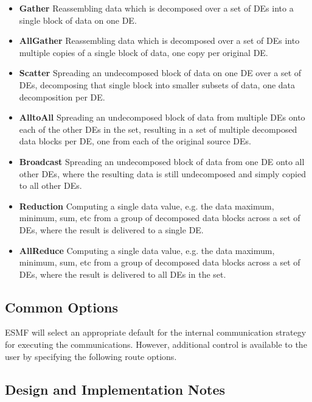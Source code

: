 \begin{itemize}

\item {\bf Gather}
Reassembling data which is decomposed over a set of DEs into a single
block of data on one DE.
\item {\bf AllGather}
Reassembling data which is decomposed over a set of DEs into multiple
copies of a single block of data, one copy per original DE.
\item {\bf Scatter}
Spreading an undecomposed block of data on one DE over a set of DEs,
decomposing that single block into smaller subsets of data, one
data decomposition per DE.
\item {\bf AlltoAll}
Spreading an undecomposed block of data from multiple DEs onto
each of the other DEs in the set, resulting in a set of multiple decomposed 
data blocks per DE, one from each of the original source DEs.
\item {\bf Broadcast}
Spreading an undecomposed block of data from one DE onto all other
DEs, where the resulting data is still undecomposed and simply
copied to all other DEs.
\item {\bf Reduction}
Computing a single data value, e.g. the data maximum, minimum, sum, etc
from a group of decomposed data blocks across a set of DEs, where the
result is delivered to a single DE.
\item {\bf AllReduce}
Computing a single data value, e.g. the data maximum, minimum, sum, etc
from a group of decomposed data blocks across a set of DEs, where the
result is delivered to all DEs in the set.

\end{itemize}

\subsection{Common Options}

ESMF will select an appropriate default for the
internal communication strategy for executing the communications.  
However, additional control is available
to the user by specifying the following route options.



\subsection{Design and Implementation Notes}

